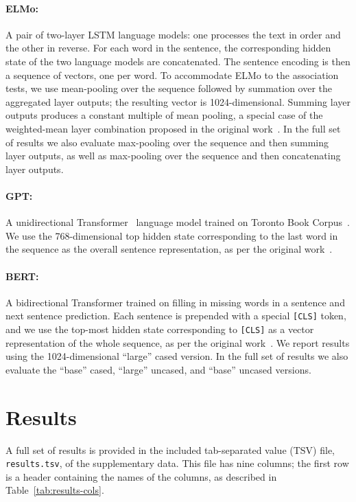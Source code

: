 \documentclass[11pt,a4paper]{article}
\begin{document}
\paragraph{ELMo:} A pair of two-layer LSTM language models: one processes the text in order and the other in reverse. For each word in the sentence, the corresponding hidden state of the two language models are concatenated. The sentence encoding is then a sequence of vectors, one per word. To accommodate ELMo to the association tests, we use mean-pooling over the sequence followed by summation over the aggregated layer outputs; the resulting vector is 1024-dimensional.  Summing layer outputs produces a constant multiple of mean pooling, a special case of the weighted-mean layer combination proposed in the original work~\citep{peters2018deep}.
In the full set of results we also evaluate max-pooling over the sequence and then summing layer outputs, as well as max-pooling over the sequence and then concatenating layer outputs.

\paragraph{GPT:} A unidirectional Transformer~\citep{Vaswani2017AttentionIA} language model trained on Toronto Book Corpus~\citep{moviebook}. We use the 768-dimensional top hidden state corresponding to the last word in the sequence as the overall sentence representation, as per the original work~\citep{radford2018improving}.

\paragraph{BERT:} A bidirectional Transformer trained on filling in missing words in a sentence and next sentence prediction. Each sentence is prepended with a special \texttt{[CLS]} token, and we use the top-most hidden state corresponding to \texttt{[CLS]} as a vector representation of the whole sequence, as per the original work~\citep{devlin2018bert}. We report results using the 1024-dimensional ``large'' cased version.  In the full set of results we also evaluate the ``base'' cased, ``large'' uncased, and ``base'' uncased versions.

\section{Results}

A full set of results is provided in the included tab-separated value (TSV) file, \texttt{results.tsv}, of the supplementary data.  This file has nine columns; the first row is a header containing the names of the columns, as described in Table~\ref{tab:results-cols}.
\end{document}
